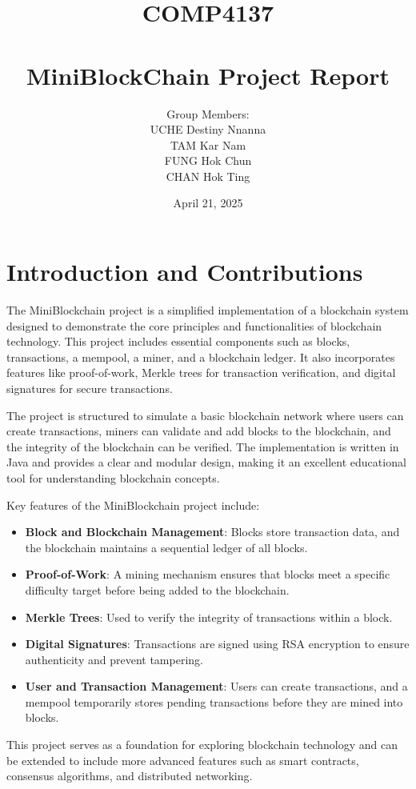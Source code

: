 \documentclass[12pt]{article}
\title{COMP4137 \\ \\ MiniBlockChain Project Report}
\author{Group Members: \\ UCHE Destiny Nnanna
\\ TAM Kar Nam
\\ FUNG Hok Chun
\\ CHAN Hok Ting
}
\date{April 21, 2025}
\begin{document}
\maketitle

\section{Introduction and Contributions}
The MiniBlockchain project is a simplified implementation of a blockchain system designed to demonstrate the core principles and functionalities of blockchain technology. This project includes essential components such as blocks, transactions, a mempool, a miner, and a blockchain ledger. It also incorporates features like proof-of-work, Merkle trees for transaction verification, and digital signatures for secure transactions.

The project is structured to simulate a basic blockchain network where users can create transactions, miners can validate and add blocks to the blockchain, and the integrity of the blockchain can be verified. The implementation is written in Java and provides a clear and modular design, making it an excellent educational tool for understanding blockchain concepts.

Key features of the MiniBlockchain project include:
\begin{itemize}
    \item \textbf{Block and Blockchain Management}: Blocks store transaction data, and the blockchain maintains a sequential ledger of all blocks.
    \item \textbf{Proof-of-Work}: A mining mechanism ensures that blocks meet a specific difficulty target before being added to the blockchain.
    \item \textbf{Merkle Trees}: Used to verify the integrity of transactions within a block.
    \item \textbf{Digital Signatures}: Transactions are signed using RSA encryption to ensure authenticity and prevent tampering.
    \item \textbf{User and Transaction Management}: Users can create transactions, and a mempool temporarily stores pending transactions before they are mined into blocks.
\end{itemize}

This project serves as a foundation for exploring blockchain technology and can be extended to include more advanced features such as smart contracts, consensus algorithms, and distributed networking.
\end{document}
